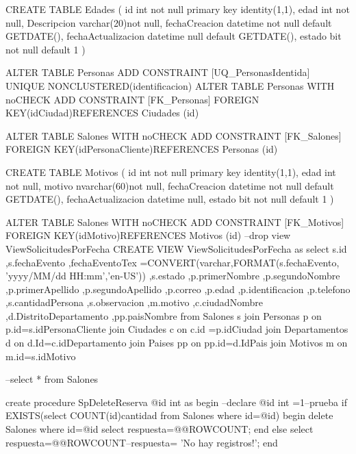 CREATE TABLE Edades
(
	id int not null primary key identity(1,1),
	edad int not null,
	Descripcion varchar(20)not null,
    fechaCreacion datetime not null default GETDATE(),
	fechaActualizacion datetime null default GETDATE(),
    estado bit not null default 1
)

ALTER TABLE Personas ADD  CONSTRAINT [UQ_PersonasIdentida] UNIQUE NONCLUSTERED(identificacion)
ALTER TABLE Personas  WITH noCHECK ADD  CONSTRAINT [FK_Personas] FOREIGN KEY(idCiudad)REFERENCES Ciudades (id)

ALTER TABLE Salones  WITH noCHECK ADD  CONSTRAINT [FK_Salones] FOREIGN KEY(idPersonaCliente)REFERENCES Personas (id)


CREATE TABLE Motivos
(
	id int not null primary key identity(1,1),
	edad int not null,
	motivo nvarchar(60)not null,
    fechaCreacion datetime not null default GETDATE(),
	fechaActualizacion datetime null,
    estado bit not null default 1
)


ALTER TABLE Salones  WITH noCHECK ADD  CONSTRAINT [FK_Motivos] FOREIGN KEY(idMotivo)REFERENCES Motivos (id)
--drop view ViewSolicitudesPorFecha
CREATE VIEW  ViewSolicitudesPorFecha as
select s.id
,s.fechaEvento
,fechaEventoTex =CONVERT(varchar,FORMAT(s.fechaEvento, 'yyyy/MM/dd HH:mm','en-US'))
,s.estado
,p.primerNombre
,p.segundoNombre
,p.primerApellido
,p.segundoApellido
,p.correo
,p.edad
,p.identificacion
,p.telefono
,s.cantidadPersona
,s.observacion
,m.motivo
,c.ciudadNombre
,d.DistritoDepartamento
,pp.paisNombre
from Salones s
join Personas p on p.id=s.idPersonaCliente
join Ciudades c on c.id =p.idCiudad
join Departamentos d on d.Id=c.idDepartamento
join Paises pp on pp.id=d.IdPais
join Motivos m on m.id=s.idMotivo


--select * from Salones

create procedure SpDeleteReserva
@id int 
as
begin 
--declare @id int =1--prueba 
if EXISTS(select COUNT(id)cantidad from Salones where id=@id)
	begin
	delete Salones where id=@id 
	select respuesta=@@ROWCOUNT; 
	end
else 
	select respuesta=@@ROWCOUNT--respuesta= 'No hay registros!';
end